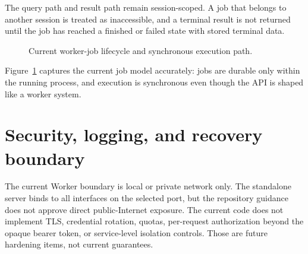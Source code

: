 The query path and result path remain session-scoped. A job that belongs to another session is treated as inaccessible, and a terminal result is not returned until the job has reached a finished or failed state with stored terminal data.

\begin{figure}[htbp]
\centering
\caption{Current worker-job lifecycle and synchronous execution path.}
\label{fig:worker-architecture-job-lifecycle}
\end{figure}

Figure~\ref{fig:worker-architecture-job-lifecycle} captures the current job model accurately: jobs are durable only within the running process, and execution is synchronous even though the API is shaped like a worker system.

\section{Security, logging, and recovery boundary}
\label{sec:worker-architecture-security}

The current Worker boundary is local or private network only. The standalone server binds to all interfaces on the selected port, but the repository guidance does not approve direct public-Internet exposure. The current code does not implement TLS, credential rotation, quotas, per-request authorization beyond the opaque bearer token, or service-level isolation controls. Those are future hardening items, not current guarantees.


